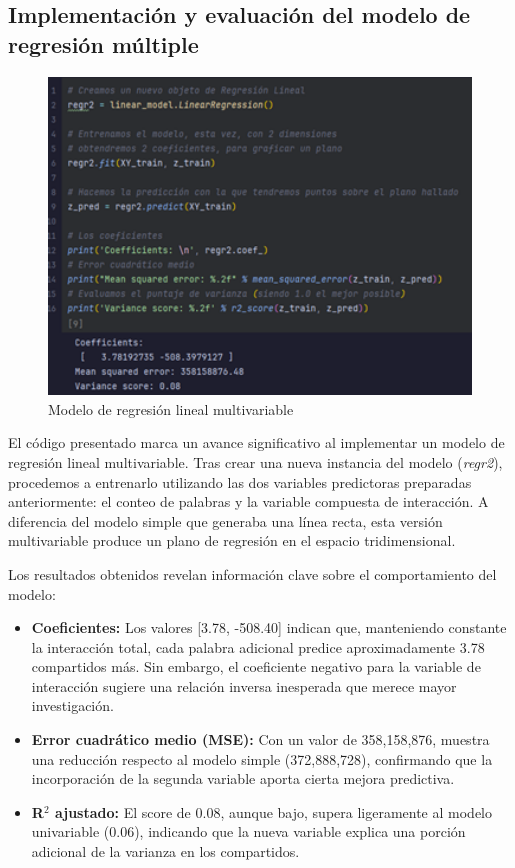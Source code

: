 \documentclass[12pt, a4paper]{article}
\begin{document}
\subsection{Implementación y evaluación del modelo de regresión múltiple}

\begin{figure}[H]
    \centering
    \includegraphics[width=1.0\textwidth]{Actividad-10/Imagen4.png}
    \caption{Modelo de regresión lineal multivariable}
\end{figure}

El código presentado marca un avance significativo al implementar un modelo de regresión lineal multivariable. Tras crear una nueva instancia del modelo (\textit{regr2}), procedemos a entrenarlo utilizando las dos variables predictoras preparadas anteriormente: el conteo de palabras y la variable compuesta de interacción. A diferencia del modelo simple que generaba una línea recta, esta versión multivariable produce un plano de regresión en el espacio tridimensional.

Los resultados obtenidos revelan información clave sobre el comportamiento del modelo:

\begin{itemize}
    \item\textbf{Coeficientes:} Los valores [3.78, -508.40] indican que, manteniendo constante la interacción total, cada palabra adicional predice aproximadamente 3.78 compartidos más. Sin embargo, el coeficiente negativo para la variable de interacción sugiere una relación inversa inesperada que merece mayor investigación.
    \item\textbf{Error cuadrático medio (MSE):} Con un valor de 358,158,876, muestra una reducción respecto al modelo simple (372,888,728), confirmando que la incorporación de la segunda variable aporta cierta mejora predictiva.
    \item\textbf{R$^2$ ajustado:} El score de 0.08, aunque bajo, supera ligeramente al modelo univariable (0.06), indicando que la nueva variable explica una porción adicional de la varianza en los compartidos.
\end{itemize}
\end{document}
